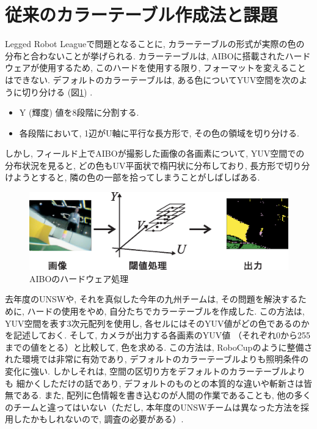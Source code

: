 \documentclass[a4paper,11pt]{jarticle}
\begin{document}
\section{従来のカラーテーブル作成法と課題}
Legged Robot Leagueで問題となることに,
カラーテーブルの形式が実際の色の分布と合わないことが挙げられる. 
カラーテーブルは, AIBOに搭載されたハードウェアが使用するため,
このハードを使用する限り, フォーマットを変えることはできない. 
デフォルトのカラーテーブルは,
ある色についてYUV空間を次のように切り分ける (図\ref{fig:hard}) . 

\begin{itemize}
	\item Y (輝度) 値を8段階に分割する. 
	\item 各段階において, 1辺がU軸に平行な長方形で,
その色の領域を切り分ける. 

\end{itemize}
しかし, フィールド上でAIBOが撮影した画像の各画素について,
YUV空間での分布状況を見ると, どの色もUV平面状で楕円状に分布しており,
長方形で切り分けようとすると, 隣の色の一部を拾ってしまうことがしばしばある. 

\begin{figure}[H]
	\begin{center}
	\includegraphics[width=0.99\linewidth]{Fig/hard.eps}
	\caption{AIBOのハードウェア処理}
	\label{fig:hard}
	\end{center}
\end{figure}
去年度のUNSWや, それを真似した今年の九州チームは,
その問題を解決するために, ハードの使用をやめ,
自分たちでカラーテーブルを作成した. 
この方法は, YUV空間を表す3次元配列を使用し,
各セルにはそのYUV値がどの色であるのかを記述しておく. 
そして, カメラが出力する各画素のYUV値
（それぞれ0から255までの値をとる）と比較して, 色を求める. 
この方法は, RoboCupのように整備された環境では非常に有効であり,
デフォルトのカラーテーブルよりも照明条件の変化に強い. 
しかしそれは, 空間の区切り方をデフォルトのカラーテーブルよりも
細かくしただけの話であり,
デフォルトのものとの本質的な違いや斬新さは皆無である. 
また, 配列に色情報を書き込むのが人間の作業であることも,
他の多くのチームと違ってはいない（ただし,
本年度のUNSWチームは異なった方法を採用したかもしれないので,
調査の必要がある）. 
\end{document}
